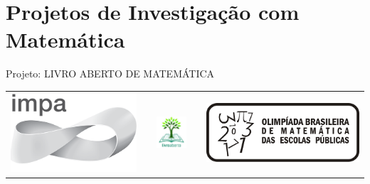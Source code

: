 \renewcommand\chapterillustration{./abertura-investigacao}%
\def\chapterwhat{Taxas, índices e indicadores sociais, econômicos e ambientais. Compreensão de aspectos teóricos e práticos dessas informações, com uma metodologia que busca a análise de situações reais, tanto locais quanto globais.}

\def\chapterbecause{Na era da informação, somos inundados por dados sobre os mais diversos fenômenos da realidade. Compreender a obtenção e organização desses dados torna-se importante para planejarmos ações que busquem uma organização social mais justa e sustentável.} 
\chapter{Projetos de Investigação com Matemática}
\label{ladri-chap}

\mbox{}\thispagestyle{empty}\clearpage

\thispagestyle{empty}

\begin{center}
Projeto: LIVRO ABERTO DE MATEMÁTICA

\noindent \begin{tabular}{lcccr}
\includegraphics[scale=.15]{impa}& \quad\quad& \includegraphics[width=3cm]{logo} & \quad\quad& \includegraphics[scale=.24]{obmep} 
\end{tabular}
\end{center}

